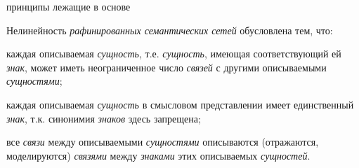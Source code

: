 \begin{SCn}
\begin{scnsubstruct}
\begin{scnindent}
\begin{scnrelfromvector}{принципы лежащие в основе}
{Нелинейность \textit{рафинированных семантических сетей} обусловлена тем, что:
\begin{scnitemize}
	\item каждая описываемая \textit{сущность}, т.е. \textit{сущность}, имеющая соответствующий ей \textit{знак}, может иметь неограниченное число \textit{связей} с другими описываемыми \textit{сущностями};
	\item каждая описываемая \textit{сущность} в смысловом представлении имеет единственный \textit{знак}, т.к. синонимия \textit{знаков} здесь запрещена;
	\item все \textit{связи} между описываемыми \textit{сущностями} описываются (отражаются, моделируются) \textit{связями} между \textit{знаками} этих описываемых \textit{сущностей}.
\end{scnitemize}}
\begin{scnindent}
\end{scnindent}
\end{scnrelfromvector}

\begin{scnindent}
\begin{scnindent}


\end{scnindent}
\end{scnindent}
\end{scnindent}
\end{scnsubstruct}
\end{SCn}
